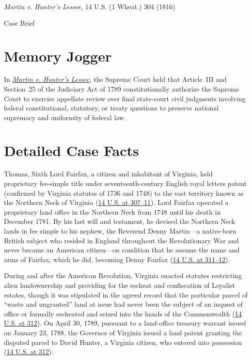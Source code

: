 \documentclass[12pt]{article}
\begin{document}
\begin{center}
{\LARGE \textit{Martin v. Hunter's Lessee}, 14 U.S. (1 Wheat.) 304 (1816)\par}
\vspace{0.8em}
{\large Case Brief\par}
\end{center}
\vspace{1em}

\section{Memory Jogger}

In \textit{\href{https://www.courtlistener.com/opinion/85160/martin-v-hunters-lessee/}{Martin v. Hunter's Lessee}}, the Supreme Court held that Article~III and Section~25 of the Judiciary Act of 1789 constitutionally authorize the Supreme Court to exercise appellate review over final state-court civil judgments involving federal constitutional, statutory, or treaty questions to preserve national supremacy and uniformity of federal law.

\section{Detailed Case Facts}

Thomas, Sixth Lord Fairfax, a citizen and inhabitant of Virginia, held proprietary fee-simple title under seventeenth-century English royal letters patent (confirmed by Virginia statutes of 1736 and 1748) to the vast territory known as the Northern Neck of Virginia (\href{https://supreme.justia.com/cases/federal/us/14/304/}{14 U.S. at 307--11}). Lord Fairfax operated a proprietary land office in the Northern Neck from 1748 until his death in December 1781. By his last will and testament, he devised the Northern Neck lands in fee simple to his nephew, the Reverend Denny Martin---a native-born British subject who resided in England throughout the Revolutionary War and never became an American citizen---on condition that he assume the name and arms of Fairfax, which he did, becoming Denny Fairfax (\href{https://supreme.justia.com/cases/federal/us/14/304/}{14 U.S. at 311--12}).

During and after the American Revolution, Virginia enacted statutes restricting alien landownership and providing for the escheat and confiscation of Loyalist estates, though it was stipulated in the agreed record that the particular parcel of ``waste and ungranted'' land at issue had never been the subject of an inquest of office or formally escheated and seized into the hands of the Commonwealth (\href{https://supreme.justia.com/cases/federal/us/14/304/}{14 U.S. at 312}). On April 30, 1789, pursuant to a land-office treasury warrant issued on January 23, 1788, the Governor of Virginia issued a land patent granting the disputed parcel to David Hunter, a Virginia citizen, who entered into possession (\href{https://supreme.justia.com/cases/federal/us/14/304/}{14 U.S. at 312}).
\end{document}
